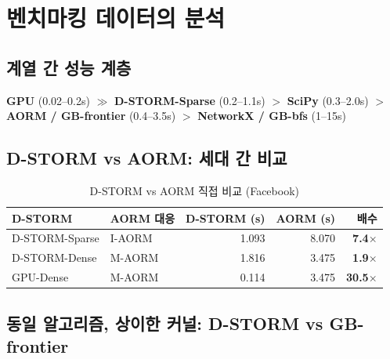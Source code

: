 \documentclass[11pt,a4paper]{article}
\begin{document}
\section{벤치마킹 데이터의 분석}

\subsection{계열 간 성능 계층}

\begin{tcolorbox}[colback=gray!5, colframe=gray!50!black, title=성능 계층 (소세계 그래프 기준)]
\textbf{GPU} (0.02--0.2s) $\gg$ \textbf{D-STORM-Sparse} (0.2--1.1s) $>$ \textbf{SciPy} (0.3--2.0s) $>$ \textbf{AORM / GB-frontier} (0.4--3.5s) $>$ \textbf{NetworkX / GB-bfs} (1--15s)
\end{tcolorbox}

\subsection{D-STORM vs AORM: 세대 간 비교}

\begin{table}[H]\centering
\caption{D-STORM vs AORM 직접 비교 (Facebook)}
\small
\begin{tabular}{@{}llrrr@{}}
\toprule
\textbf{D-STORM} & \textbf{AORM 대응} & \textbf{D-STORM (s)} & \textbf{AORM (s)} & \textbf{배수} \\
\midrule
D-STORM-Sparse & I-AORM & 1.093 & 8.070 & \textbf{7.4$\times$} \\
D-STORM-Dense & M-AORM & 1.816 & 3.475 & \textbf{1.9$\times$} \\
GPU-Dense & M-AORM & 0.114 & 3.475 & \textbf{30.5$\times$} \\
\bottomrule
\end{tabular}
\end{table}

\subsection{동일 알고리즘, 상이한 커널: D-STORM vs GB-frontier}
\end{document}
